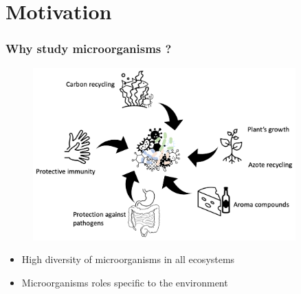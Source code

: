 \documentclass[8pt]{beamer}
\begin{document}
\section{Motivation}

\begin{frame}
\frametitle{Why study microorganisms ?}
\begin{figure}[t]
\centering   
\includegraphics[width=0.9\textwidth]{figures/bacterial-env.pdf}
\end{figure}
\begin{block}{}
\begin{itemize}
\item High diversity of microorganisms in all ecosystems
\item Microorganisms roles specific to the environment \tiny\citep{10.1093/chemse/bjh067,BELKAID2014121,Zhang2015,Hoorman2011,McSweeney2000}
\end{itemize}
\end{block}
\end{frame}
\end{document}
